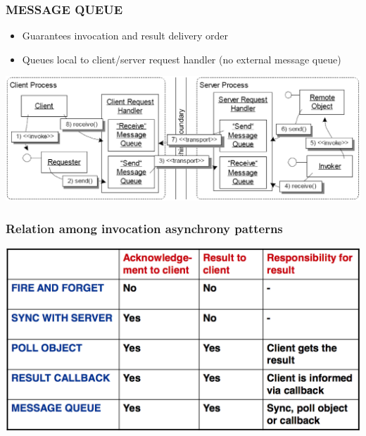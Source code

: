 \documentclass[10pt]{article}
\begin{document}
\subsubsection{MESSAGE QUEUE}
\begin{itemize}
	\item Guarantees invocation and result delivery order
	\item Queues local to client/server request handler (no external message queue)
\end{itemize}
\begin{center}
	\includegraphics[scale=0.2]{images/message-queue.png}
\end{center}
\subsubsection{Relation among invocation asynchrony patterns}
\begin{center}
	\includegraphics[scale=0.2]{images/asynchrony-pattern-compare.png}
\end{center}
\end{document}
